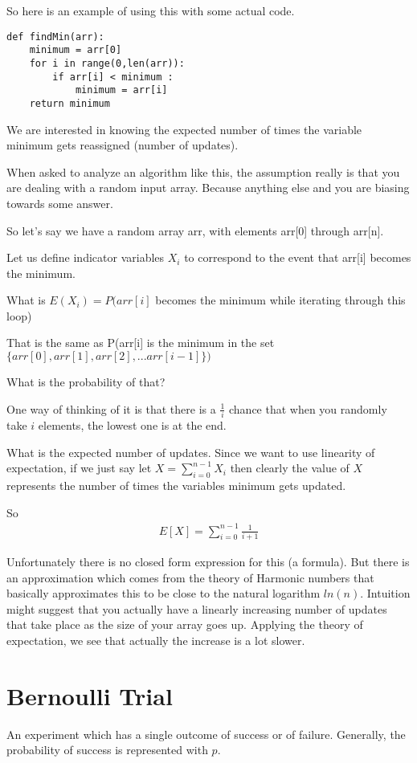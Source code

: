 \documentclass[12pt]{article}
\begin{document}
So here is an example of using this with some actual code.

\begin{verbatim}
def findMin(arr):
    minimum = arr[0]
    for i in range(0,len(arr)):
        if arr[i] < minimum :
            minimum = arr[i]
    return minimum
\end{verbatim}

We are interested in knowing the expected number of times the variable minimum gets reassigned (number of updates). 

When asked to analyze an algorithm like this, the assumption really is that you are dealing with a random input array. Because anything else and you are biasing towards some answer.

So let's say we have a random array arr, with elements arr[0] through arr[n].

Let us define indicator variables $X_i$ to correspond to the event that arr[i] becomes the minimum. 

What is $E(X_i) = P(arr[i]$ becomes the minimum while iterating through this loop)

That is the same as P(arr[i] is the minimum in the set 
$\{arr[0], arr[1], arr[2],...arr[i-1]\})$
 
What is the probability of that? 

One way of thinking of it is that there is a $\frac{1}{i}$ chance that when you randomly take $i$ elements, the lowest one is at the end. 

What is the expected number of updates. Since we want to use linearity of expectation, if we 
just say let $\displaystyle X = \sum_{i=0}^{n-1}X_i$ then clearly the value of $X$ represents the number of times the variables minimum gets updated.

So
\begin{align*}
E[X] = \sum_{i=0}^{n-1} \frac{1}{i+1} 
\end{align*} 

Unfortunately there is no closed form expression for this (a formula). But there is an approximation which comes from the theory of Harmonic numbers that basically approximates this to be close to the natural logarithm $ln(n)$. Intuition might suggest that you actually have a linearly increasing number of updates that take place as the size of your array goes up. Applying the theory of expectation, we see that actually the increase is a lot slower.

\section*{Bernoulli Trial}
An experiment which has a single outcome of success or of failure. Generally, the probability of success is represented with $p$. 
\end{document}
